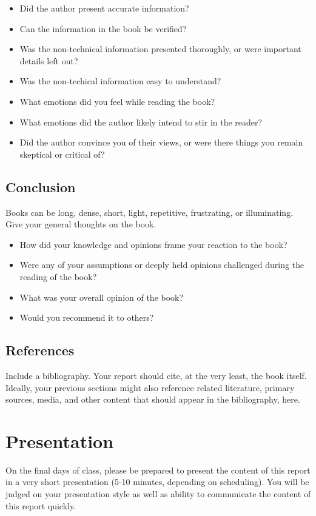 \documentclass{article}
\begin{document}
\begin{itemize}
        \item Did the author present accurate information? 
	\item Can the information in the book be verified?
	\item Was the non-technical information presented thoroughly, or were important details left out? 
	\item Was the non-techical information easy to understand? 
	\item What emotions did you feel while reading the book?
	\item What emotions did the author likely intend to stir in the reader?
	\item Did the author convince you of their views, or were there things you remain skeptical or critical of?
\end{itemize}

\subsection{Conclusion}
Books can be long, dense, short, light, repetitive, frustrating, or illuminating. Give your general thoughts on the book.
\begin{itemize}
	\item How did your knowledge and opinions frame your reaction to the book? 
	\item Were any of your assumptions or deeply held opinions challenged during the reading of the book? 
	\item What was your overall opinion of the book?
	\item Would you recommend it to others? 
\end{itemize}

\subsection{References}
Include a bibliography. Your report should cite, at the very least, the book itself. Ideally, your previous sections might also reference related literature, primary sources, media, and other content that should appear in the bibliography, here.



\section{Presentation}
On the final days of class, please be prepared to present the content of this report in a very short presentation (5-10 minutes, depending on scheduling). You will be judged on your presentation style as well as ability to communicate the content of this report quickly.
\end{document}
